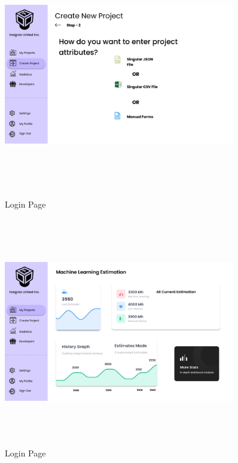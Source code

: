 \begin{figure}[H]
\includegraphics[height=10cm, width=0.9\textwidth]{./images/prototype/0012}
\centering 
\caption{Login Page}
\label{fig:prototype1}

\includegraphics[height=10cm, width=0.9\textwidth]{./images/prototype/0013}
\centering 
\caption{Login Page}
\label{fig:prototype1}
\end{figure}

